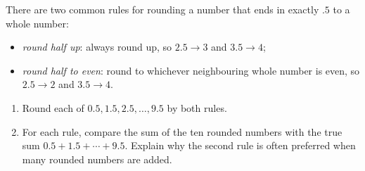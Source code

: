 There are two common rules for rounding a number that ends in exactly $.5$ to a whole number:
\begin{itemize}
\item \emph{round half up}: always round up, so $2.5\to3$ and $3.5\to4$;
\item \emph{round half to even}: round to whichever neighbouring whole number is even, so $2.5\to2$ and $3.5\to4$.
\end{itemize}
\begin{enumerate}
\item[(a)] Round each of $0.5,1.5,2.5,\dots,9.5$ by both rules.
\item[(b)] For each rule, compare the sum of the ten rounded numbers with the true sum $0.5+1.5+\cdots+9.5$. Explain why the second rule is often preferred when many rounded numbers are added.
\end{enumerate}
